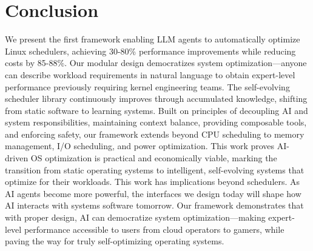 \section{Conclusion}

We present the first framework enabling LLM agents to automatically optimize Linux schedulers, achieving 30-80\% performance improvements while reducing costs by 85-88\%. Our modular design democratizes system optimization—anyone can describe workload requirements in natural language to obtain expert-level performance previously requiring kernel engineering teams. The self-evolving scheduler library continuously improves through accumulated knowledge, shifting from static software to learning systems. Built on principles of decoupling AI and system responsibilities, maintaining context balance, providing composable tools, and enforcing safety, our framework extends beyond CPU scheduling to memory management, I/O scheduling, and power optimization. This work proves AI-driven OS optimization is practical and economically viable, marking the transition from static operating systems to intelligent, self-evolving systems that optimize for their workloads. This work has implications beyond schedulers. As AI agents become more powerful, the interfaces we design today will shape how AI interacts with systems software tomorrow. Our framework demonstrates that with proper design, AI can democratize system optimization—making expert-level performance accessible to users from cloud operators to gamers, while paving the way for truly self-optimizing operating systems.